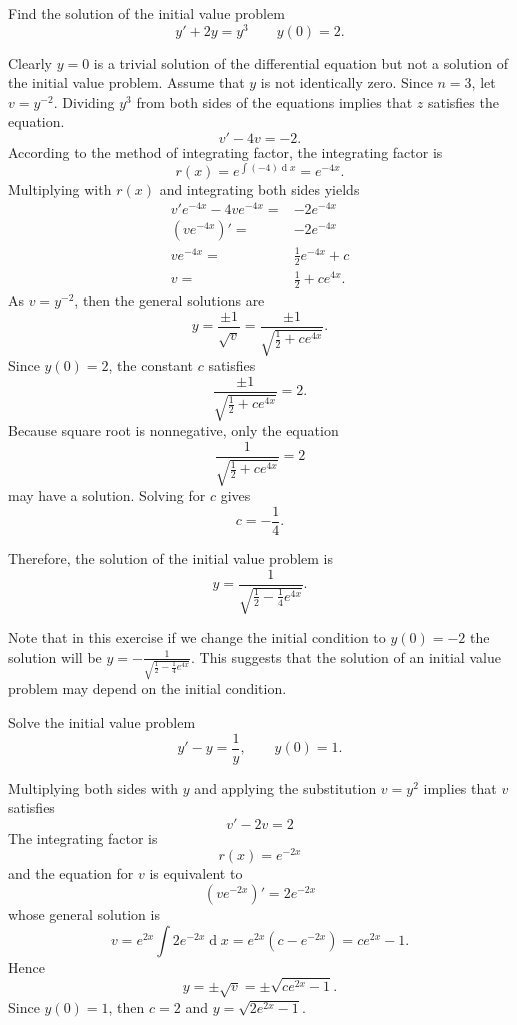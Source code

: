 \begin{example}
  Find the solution of the initial value problem
  \[y' + 2 y  =  y^3\qquad y(0)=2.\]
\end{example}
\begin{solution}
  Clearly $y=0$ is a trivial solution of the differential equation but not a solution of the initial value problem.
  Assume that $y$ is not identically zero.
  Since $n=3$, let $v=y^{-2}$. Dividing $y^3$ from both sides of the equations implies that $z$ satisfies the equation.
  \[v' - 4 v = -2.\]
  According to the method of integrating factor, the integrating factor is 
  \[r(x) = e^{\int (-4) \operatorname{d} x} = e^{-4x}.\]
  Multiplying with $r(x)$ and integrating both sides yields
  \[
  \begin{aligned}
    v'e^{-4x} - 4 ve^{-4x} =& -2e^{-4x}\\
    \left(v e^{-4x}\right)'=&-2e^{-4x}\\
    ve^{-4x}=&\frac12 e^{-4x} + c\\
    v=& \frac{1}{2} + c e^{4x}.
  \end{aligned}  
  \]
   As $v=y^{-2}$, then the general solutions are
  \[y= \frac{\pm 1}{\sqrt{v}} =  \frac{\pm 1}{\sqrt{ \frac{1}{2} + c e^{4x}}}.\]
  Since $y(0)=2$, the constant $c$ satisfies
  \[\frac{\pm 1}{\sqrt{ \frac{1}{2} + c e^{4x}}}=2.\]
  Because square root is nonnegative, only the equation
  \[\frac{1}{\sqrt{ \frac{1}{2} + c e^{4x}}}=2\]
  may have a solution. Solving for $c$ gives
  \[c=-\frac14.\]

  Therefore, the solution of the initial value problem is 
  \[y= \frac{1}{\sqrt{\frac{1}{2} - \frac14 e^{4x}}}.\]
\end{solution}

\begin{remark}
  Note that in this exercise if we change the initial condition to $y(0)=-2$ the solution will be  $y= -\frac{1}{\sqrt{\frac{1}{2} - \frac14 e^{4x}}}$. This suggests that the solution of an initial value problem may depend on the initial condition.
\end{remark}


\begin{exercise}
  Solve the initial value problem
 		\[
 		y' - y =\frac{1}{y}, \qquad y(0)=1.
 		\]
\end{exercise}
\begin{exersol}
  Multiplying both sides with $y$ and applying the 
 substitution $v= y^2$ implies that $v$ satisfies 
  \[v' - 2v = 2\]
  The integrating factor is
  \[r(x) = e^{-2x}\]
  and the equation for $v$ is equivalent to
  \[(ve^{-2x})' = 2e^{-2x}\]
  whose general solution is
  \[v= e^{2x} \int 2 e^{-2x} \operatorname{d} x = e^{2x} (c- e^{-2x}) = ce^{2x} -1.\]
  Hence
  \[y= \pm \sqrt{v} = \pm \sqrt{ce^{2x} -1}.\]
  Since $y(0)=1$, then $c=2$ and $y=\sqrt{2 e^{2x} -1}$.
\end{exersol}


